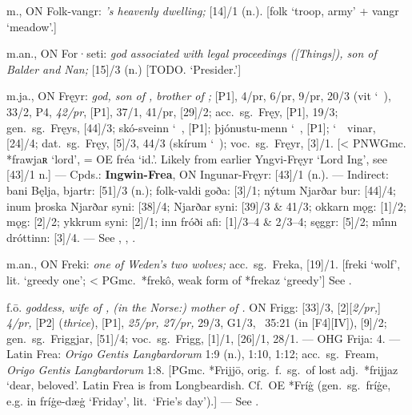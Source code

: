 \begin{itemize}
 m., ON Folk-vangr:
  \emph{’s heavenly dwelling;} [14]/1 (n.).
  [folk ‘troop, army’ + vangr ‘meadow’.]

 m.an., ON For·seti:
  \emph{god associated with legal proceedings ([Things]), son of Balder and Nan;} [15]/3 (n.)
  [TODO. ‘Presider.’]

 m.ja., ON Fręyr:
  \emph{god, son of , brother of ;} [P1], 4/pr, 6/pr, 9/pr, 20/3 (vit \char`~), 33/2, P4, \emph{42/pr}, [P1], 37/1, 41/pr, [29]/2;
  acc.~sg.~Fręy, [P1], 19/3;
  gen.~sg.~Fręys, [44]/3; skó-sveinn \char`~, [P1]; þjónustu-menn \char`~, [P1]; \char`~\ vinar, [24]/4;
  dat.~sg.~Fręy, [5]/3, 44/3 (skírum \char`~);
  voc.~sg.~Fręyr, [3]/1.
  [< PNWGmc. *frawjaʀ ‘lord’, = OE fréa ‘id.’.  Likely from earlier Yngvi-Fręyr ‘Lord Ing’, see [43]/1 n.]
  --- Cpds.: \textbf{Ingwin-Frea}, ON Ingunar-Fręyr: [43]/1 (n.).
  --- Indirect: bani Bęlja, bjartr: [51]/3 (n.); folk-valdi goða: [3]/1; nýtum Njarðar bur: [44]/4; inum þroska Njarðar syni: [38]/4; Njarðar syni: [39]/3 \& 41/3; okkarn mǫg: [1]/2; mǫg: [2]/2; ykkrum syni: [2]/1; inn fróði afi: [1]/3--4 \& 2/3--4; sęggr: [5]/2; mi̇́nn dróttinn: [3]/4.
  --- See , , .

 m.an., ON Freki:
  \emph{one of Weden’s two wolves;} acc.~sg.~Freka, [19]/1.
  [freki ‘wolf’, lit. ‘greedy one’; < PGmc.~*frekô, weak form of *frekaz ‘greedy’]
  See .

 f.ō.
  \emph{goddess, wife of , (in the Norse:) mother of .}
  ON Frigg: [33]/3, [2][\emph{2/pr,}] \emph{4/pr,} [P2] (\emph{thrice}), [P1], \emph{25/pr, 27/pr,} 29/3, G1/3, \Gylfaginning~35:21 (in [F4][IV]), [9]/2; gen.~sg.~Friggjar, [51]/4; voc.~sg.~Frigg, [1]/1, [26]/1, 28/1.
  --- OHG Frija:  4.
  --- Latin Frea: \emph{Origo Gentis Langbardorum} 1:9 (n.), 1:10, 1:12; acc.~sg.~Fream, \emph{Origo Gentis Langbardorum} 1:8.
  [PGmc. *Frijjō, orig.~f.~sg.~of lost adj.~*frijjaz ‘dear, beloved’.  Latin Frea is from Longbeardish.  Cf.~OE *Fríġ (gen.~sg.~fríġe, e.g. in fríġe-dæġ ‘Friday’, lit.~‘Frie’s day’).]
  --- See .


\end{itemize}
